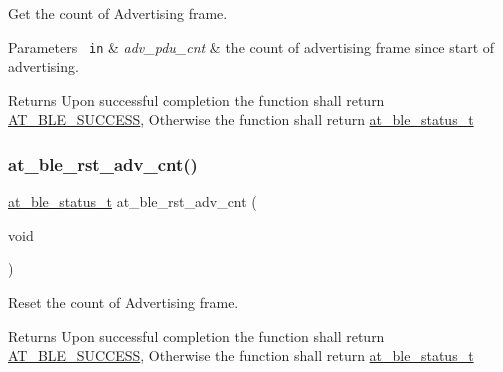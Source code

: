 Get the count of Advertising frame. 


\begin{DoxyParams}[1]{Parameters}
\mbox{\texttt{ in}}  & {\em adv\+\_\+pdu\+\_\+cnt} & the count of advertising frame since start of advertising.\\
\hline
\end{DoxyParams}
\begin{DoxyReturn}{Returns}
Upon successful completion the function shall return \mbox{\hyperlink{group__error__codes__group_gga3b1db9b95feb157b3c188ca27fe76988a7e3bfff5387331cd4f2c56cbcbbd7e19}{A\+T\+\_\+\+B\+L\+E\+\_\+\+S\+U\+C\+C\+E\+SS}}, Otherwise the function shall return \mbox{\hyperlink{at__ble__api_8h_ace24eb4e5ca3f325c663b809da5feb92}{at\+\_\+ble\+\_\+status\+\_\+t}} 
\end{DoxyReturn}
\mbox{\label{group__gap__adv__group_ga79cce7e0365a099993a4b05dedafa523}} 
\subsubsection{\texorpdfstring{at\_ble\_rst\_adv\_cnt()}{at\_ble\_rst\_adv\_cnt()}}
{\footnotesize\ttfamily \mbox{\hyperlink{group__error__codes__group_ga3b1db9b95feb157b3c188ca27fe76988}{at\+\_\+ble\+\_\+status\+\_\+t}} at\+\_\+ble\+\_\+rst\+\_\+adv\+\_\+cnt (\begin{DoxyParamCaption}\item[{void}]{ }\end{DoxyParamCaption})}



Reset the count of Advertising frame. 

\begin{DoxyReturn}{Returns}
Upon successful completion the function shall return \mbox{\hyperlink{group__error__codes__group_gga3b1db9b95feb157b3c188ca27fe76988a7e3bfff5387331cd4f2c56cbcbbd7e19}{A\+T\+\_\+\+B\+L\+E\+\_\+\+S\+U\+C\+C\+E\+SS}}, Otherwise the function shall return \mbox{\hyperlink{at__ble__api_8h_ace24eb4e5ca3f325c663b809da5feb92}{at\+\_\+ble\+\_\+status\+\_\+t}} 
\end{DoxyReturn}

